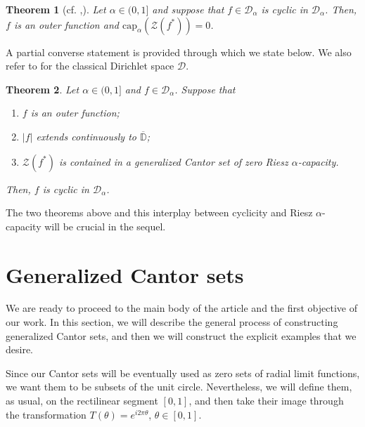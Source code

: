 \documentclass[12pt]{amsart}
\newtheorem{theorem}{Theorem}[section]
\theoremstyle{definition}\newtheorem{remark}[theorem]{Remark}
\theoremstyle{definition}\newtheorem{example}[theorem]{Example}
\theoremstyle{definition}\newtheorem{definition}{Definition}
\numberwithin{equation}{section}
\newcommand\cD{{\mathcal D}}
\newcommand\DD{{\mathbb D}}
\begin{document}
\begin{theorem}[{cf. \cite[Corollary 1, Theorem 5]{Brown-Shields},\cite[Theorem 1.1]{EFKR}}] \label{thm: efkr 1}
    Let $\alpha\in(0,1]$ and suppose that $f\in\mathcal{\cD}_\alpha$ is cyclic in $\cD_{\alpha}$. Then, $f$ is an outer function and $\mathrm{cap}_{\alpha}(\mathcal{Z}(f^*))=0$.
\end{theorem}
A partial converse statement is provided through \cite[Theorem 1.2]{EFKR} which we state below. We also refer to \cite[Corollary 1.2]{EFKR*} for the classical Dirichlet space $\cD$.
\begin{theorem}\label{thm: efkr 2}
    Let $\alpha\in(0,1]$ and $f\in\mathcal{\cD}_\alpha$. Suppose that
    \begin{enumerate}
        \item[\textup{(i)}] $f$ is an outer function;
        \item[\textup{(ii)}] $|f|$ extends continuously to $\overline{\DD}$;
        \item[\textup{(iii)}] $\mathcal{Z}(f^*)$ is contained in a generalized Cantor set of zero Riesz $\alpha$-capacity.
    \end{enumerate}
    Then, $f$ is cyclic in $\cD_\alpha$.
\end{theorem}
The two theorems above and this interplay between cyclicity and Riesz $\alpha$-capacity will be crucial in the sequel.


\section{Generalized Cantor sets}\label{sec:cantor}

We are ready to proceed to the main body of the article and the first objective of our work. In this section, we will describe the general process of constructing generalized Cantor sets, and then we will construct the explicit examples that we desire.

Since our Cantor sets will be eventually used as zero sets of radial limit functions, we want them to be subsets of the unit circle. Nevertheless, we will define them, as usual, on the rectilinear segment $[0,1]$, and then take their image through the transformation $T(\theta)=e^{i2\pi\theta}$, $\theta\in[0,1]$.
\end{document}

